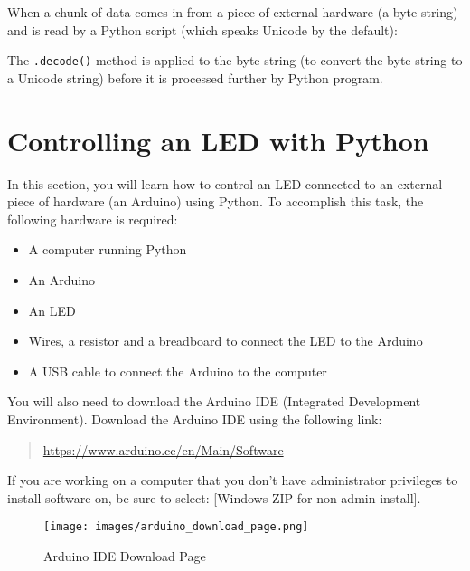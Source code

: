 \documentclass{book}
\makeatletter
\def\maxwidth{\ifdim\Gin@nat@width>\linewidth\linewidth
\else\Gin@nat@width\fi}
\let\Oldincludegraphics\includegraphics
\renewcommand{\includegraphics}[1]{\Oldincludegraphics[width=.8\maxwidth]{#1}}
\providecommand{\tightlist}{%
      \setlength{\itemsep}{0pt}\setlength{\parskip}{0pt}}
\newcommand{\passthrough}[1]{#1}
\makeatother
\begin{document}
When a chunk of data comes in from a piece of external hardware (a byte
string) and is read by a Python script (which speaks Unicode by the
default):

The \passthrough{\lstinline!.decode()!} method is applied to the byte
string (to convert the byte string to a Unicode string) before it is
processed further by Python program.
    




    
        \hypertarget{controlling-an-led-with-python}{%
\section{Controlling an LED with
Python}\label{controlling-an-led-with-python}}
    




    
        In this section, you will learn how to control an LED connected to an
external piece of hardware (an Arduino) using Python. To accomplish this
task, the following hardware is required:

\begin{itemize}
\tightlist
\item
  A computer running Python
\item
  An Arduino
\item
  An LED
\item
  Wires, a resistor and a breadboard to connect the LED to the Arduino
\item
  A USB cable to connect the Arduino to the computer
\end{itemize}
    




    
        You will also need to download the Arduino IDE (Integrated Development
Environment). Download the Arduino IDE using the following link:

\begin{quote}
\url{https://www.arduino.cc/en/Main/Software}
\end{quote}

If you are working on a computer that you don't have administrator
privileges to install software on, be sure to select: {[}Windows ZIP for
non-admin install{]}.

\begin{figure}
\centering
\texttt{[image: images/arduino\_download\_page.png]}
\caption{Arduino IDE Download Page}
\end{figure}
    
\end{document}
